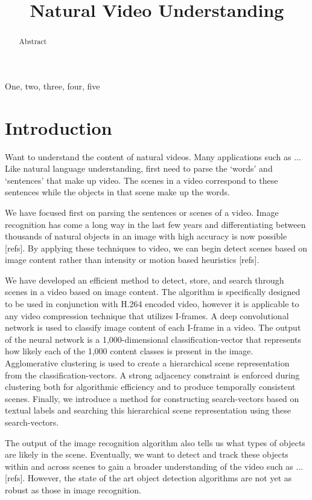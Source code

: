 \documentclass{article}
\title{Natural Video Understanding}
\begin{document}
\maketitle

\begin{abstract}
Abstract
\end{abstract}

\begin{keywords}
One, two, three, four, five
\end{keywords}

\section{Introduction}
\label{sec:intro}

Want to understand the content of natural videos.
Many applications such as ...
Like natural language understanding, first need to parse the `words' and `sentences' that make up video.
The scenes in a video correspond to these sentences while the objects in that scene make up the words.

We have focused first on parsing the sentences or scenes of a video.
Image recognition has come a long way in the last few years and differentiating between thousands of natural objects in an image with high accuracy is now possible [refs].
By applying these techniques to video, we can begin detect scenes based on image content rather than intensity or motion based heuristics [refs].

We have developed an efficient method to detect, store, and search through scenes in a video based on image content.
The algorithm is specifically designed to be used in conjunction with H.264 encoded video, however it is applicable to any video compression technique that utilizes I-frames.
A deep convolutional network is used to classify image content of each I-frame in a video.
The output of the neural network is a 1,000-dimensional classification-vector that represents how likely each of the 1,000 content classes is present in the image.
Agglomerative clustering is used to create a hierarchical scene representation from the classification-vectors.
A strong adjacency constraint is enforced during clustering both for algorithmic efficiency and to produce temporally consistent scenes.
Finally, we introduce a method for constructing search-vectors based on textual labels and searching this hierarchical scene representation using these search-vectors.

The output of the image recognition algorithm also tells us what types of objects are likely in the scene.
Eventually, we want to detect and track these objects within and across scenes to gain a broader understanding of the video such as ... [refs].
However, the state of the art object detection algorithms are not yet as robust as those in image recognition.
\end{document}
